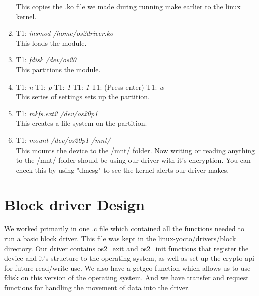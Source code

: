 \documentclass[onecolumn,draftclsnofoot, 10pt, compsoc]{IEEEtran}
\begin{document}
\begin{enumerate}
		This copies the .ko file we made during running make earlier to the linux kernel.
		\item
		T1: \textit{insmod /home/os2driver.ko } \\
		This loads the module.
		\item
		T1: \textit{fdisk /dev/os20} \\
		This partitions the module.
		\item
		T1: \textit{n}
		T1: \textit{p}
		T1: \textit{1}
		T1: \textit{1}
		T1: (Press enter)
		T1: \textit{w}\\
		This series of settings sets up the partition.
		\item
		T1: \textit{mkfs.ext2 /dev/os20p1 } \\
		This creates a file system on the partition.
		\item
		T1: \textit{mount /dev/os20p1 /mnt/ } \\
		This mounts the device to the /mnt/ folder. Now writing or reading anything to the /mnt/ folder should be using our driver with it's encryption. You can check this by using "dmesg" to see the kernel alerts our driver makes.
	\end{enumerate}
	
	\clearpage
	\section{Block driver Design}
		We worked primarily in one .c file which contained all the functions needed to run a basic block driver. This file was kept in the linux-yocto/drivers/block directory. Our driver contains os2\_exit and os2\_init functions that register the device and it's structure to the operating system, as well as set up the crypto api for future read/write use. We also have a getgeo function which allows us to use fdisk on this version of the operating system. And we have transfer and request functions for handling the movement of data into the driver. \\
	
\end{document}
